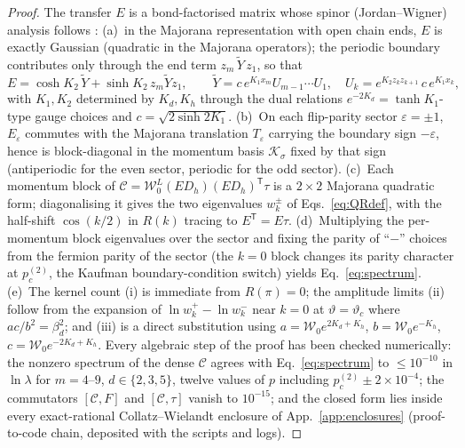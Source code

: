 \documentclass[11pt]{article}
\newcommand{\pctwo}{p_c^{(2)}}
\newcommand{\vth}{\vartheta}
\newcommand{\Ccomp}{\mathcal{C}}
\newcommand{\Wz}{\mathcal{W}_0}
\begin{document}
\begin{proof}
The transfer $E$ is a bond-factorised matrix whose spinor (Jordan--Wigner)
analysis follows \citet{Kaufman1949,Newell1950,Stephenson1964,Schultz1964}:
(a)~in the Majorana representation with open chain ends, $E$ is exactly
Gaussian (quadratic in the Majorana operators); the periodic boundary
contributes only through the end term $z_m\,\tilde Y\,z_1$, so that
\begin{equation}
  E=\cosh K_2\,\tilde Y+\sinh K_2\,z_m\tilde Y z_1,\qquad
  \tilde Y=c\,e^{K_1x_m}U_{m-1}\cdots U_1,\quad
  U_k=e^{K_2z_kz_{k+1}}\,c\,e^{K_1x_k},
  \label{eq:spinor}
\end{equation}
with $K_1,K_2$ determined by $K_d,K_h$ through the dual relations
$e^{-2K_d}=\tanh K_1$-type gauge choices and $c=\sqrt{2\sinh2K_1}$.
(b)~On each flip-parity sector $\varepsilon=\pm1$, $E_\varepsilon$ commutes
with the Majorana translation $T_\varepsilon$ carrying the boundary sign
$-\varepsilon$, hence is block-diagonal in the momentum basis
$\mathcal K_\sigma$ fixed by that sign (antiperiodic for the even sector,
periodic for the odd sector).  (c)~Each momentum block of
$\Ccomp=\Wz^L(ED_h)(ED_h)^{\mathsf T}\tau$ is a $2\times2$ Majorana
quadratic form; diagonalising it gives the two eigenvalues $w_k^\pm$ of
Eqs.~\eqref{eq:QRdef}, with the half-shift $\cos(k/2)$ in $R(k)$ tracing to
$E^{\mathsf T}=E\tau$.  (d)~Multiplying the per-momentum block eigenvalues
over the sector and fixing the parity of ``$-$'' choices from the fermion
parity of the sector (the $k=0$ block changes its parity character at
$\pctwo$, the Kaufman boundary-condition switch) yields
Eq.~\eqref{eq:spectrum}.  (e)~The kernel count (i) is immediate from
$R(\pi)=0$; the amplitude limits (ii) follow from the expansion of
$\ln w_k^+-\ln w_k^-$ near $k=0$ at $\vth=\vth_c$ where
$ac/b^2=\beta_d^2$; and (iii) is a direct substitution using
$a=\Wz e^{2K_d+K_h}$, $b=\Wz e^{-K_h}$, $c=\Wz e^{-2K_d+K_h}$.
Every algebraic step of the proof has been checked numerically: the nonzero
spectrum of the dense $\Ccomp$ agrees with Eq.~\eqref{eq:spectrum} to
$\le10^{-10}$ in $\ln\lambda$ for $m=4$--$9$, $d\in\{2,3,5\}$, twelve
values of $p$ including $\pctwo\pm2\times10^{-4}$; the commutators
$[\Ccomp,F]$ and $[\Ccomp,\tau]$ vanish to $10^{-15}$; and the closed form
lies inside every exact-rational Collatz--Wielandt enclosure of
App.~\ref{app:enclosures} (proof-to-code chain, deposited with the
scripts and logs).
\end{proof}
\end{document}
